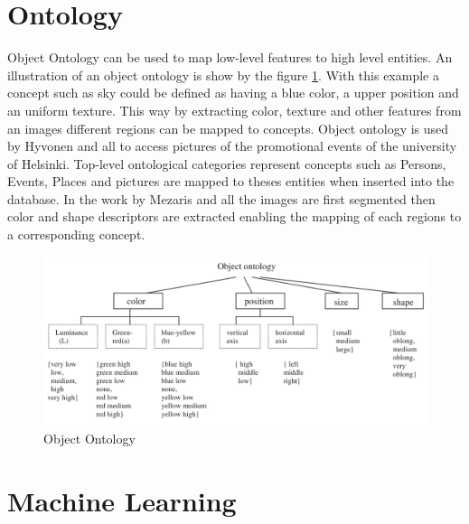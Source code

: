     \section{Ontology}

    Object Ontology can be used to map low-level features to high level entities. An illustration of an object ontology is show by the figure \ref{ontology}. With this example a concept such as sky could be defined as having a blue color, a upper position and an uniform texture. This way by extracting color, texture and other features from an images different regions can be mapped to concepts. Object ontology is used by Hyvonen and all \cite{hyvonen2003ontology} to access pictures of the promotional events of the university of Helsinki. Top-level ontological categories represent concepts such as Persons, Events, Places and pictures are mapped to theses entities when inserted into the database. In the work by Mezaris and all \cite{mezaris2003ontologies} the images are first segmented then color and shape descriptors are extracted enabling the mapping of each regions to a corresponding concept.

    \begin{figure}[H]
      \centering
        \includegraphics[width=1\textwidth]{images/ontology.png}
        \caption{Object Ontology}
        \label{ontology}
    \end{figure}

    \section{Machine Learning}

